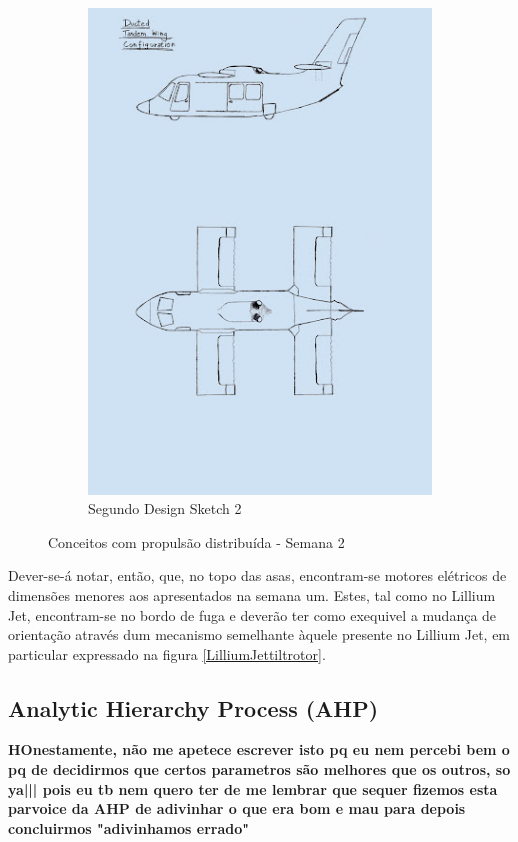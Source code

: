 \begin{figure}[h]
\begin{subfigure}[b]{0.47\textwidth}
        \includegraphics[width=\textwidth]{Imagens/segundodesign2.jpg}
        \caption{Segundo Design Sketch 2}
        \label{SecondDesingSketchini2}
    \end{subfigure}
    \caption{Conceitos com propulsão distribuída  - Semana 2}
\end{figure}
\FloatBarrier
Dever-se-á notar, então, que, no topo das asas, encontram-se motores elétricos de dimensões menores aos apresentados na semana um. Estes, tal como no Lillium Jet, encontram-se no bordo de fuga e deverão ter como exequivel a mudança de orientação através dum mecanismo semelhante àquele presente no Lillium Jet, em particular expressado na figura \ref{LilliumJettiltrotor}.\par
\subsection{Analytic Hierarchy Process (AHP)}
\textbf{HOnestamente, não me apetece escrever isto pq eu nem percebi bem o pq de decidirmos que certos parametros são melhores que os outros, so ya||| pois eu tb nem quero ter de me lembrar que sequer fizemos esta parvoice da AHP de adivinhar o que era bom e mau para depois concluirmos "adivinhamos errado"}